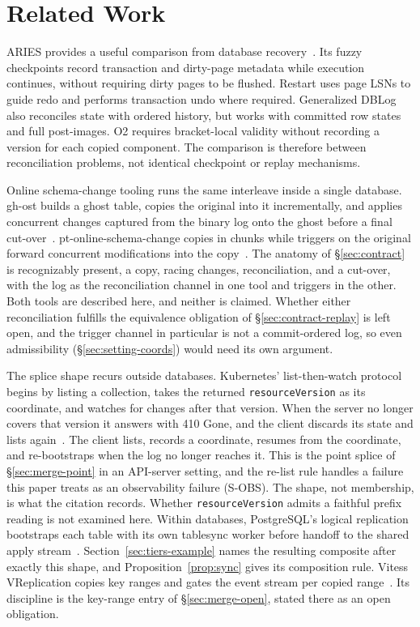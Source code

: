 \documentclass[sigconf,nonacm,10pt]{acmart}
\theoremstyle{plain}
\theoremstyle{definition}
\begin{document}
\section{Related Work}\label{sec:related}

ARIES provides a useful comparison from database recovery~\cite{mohan1992aries}. 
Its fuzzy 
checkpoints record transaction and dirty-page metadata while execution 
continues, without requiring dirty pages to be flushed. Restart uses 
page LSNs to guide redo and performs transaction undo where required. 
Generalized DBLog also reconciles state with ordered history, but works 
with committed row states and full post-images. O2 requires bracket-local 
validity without recording a version for each copied component. The 
comparison is therefore between reconciliation problems, not identical 
checkpoint or replay mechanisms.

Online schema-change tooling runs the same interleave inside a
single database. gh-ost builds a ghost table, copies the original
into it incrementally, and applies concurrent changes captured
from the binary log onto the ghost before a final
cut-over~\cite{ghost_docs}. pt-online-schema-change copies in
chunks while triggers on the original forward concurrent
modifications into the copy~\cite{ptosc_docs}. The anatomy of \S\ref{sec:contract} is recognizably present, a copy, racing changes, reconciliation, and a cut-over, with the log as the reconciliation channel in one tool and triggers in the other. Both
tools are described here, and neither is claimed. Whether either
reconciliation fulfills the equivalence obligation of
\S\ref{sec:contract-replay} is left open, and the trigger channel
in particular is not a commit-ordered log, so even admissibility
(\S\ref{sec:setting-coords}) would need its own argument.

The splice shape recurs outside databases. Kubernetes' list-then-watch
protocol begins by listing a collection, takes the returned
\texttt{resourceVersion} as its coordinate, and watches for changes
after that version. When the server no longer covers that version it
answers with 410 Gone, and the client discards its state and lists
again~\cite{k8s_api_concepts}. The client lists, records a coordinate, resumes from the coordinate, and re-bootstraps when the log no longer reaches it. This is the point splice of \S\ref{sec:merge-point} in an API-server setting, and the re-list rule handles a failure this paper treats as an observability failure (S-OBS). The shape, not
membership, is what the citation records. Whether
\texttt{resourceVersion} admits a faithful prefix reading is not
examined here. Within databases, PostgreSQL's logical replication
bootstraps each table with its own tablesync worker before
handoff to the shared apply
stream~\cite{postgres_logical_replication}.
Section~\ref{sec:tiers-example} names the resulting composite after
exactly this shape, and Proposition~\ref{prop:sync} gives its
composition rule. Vitess VReplication copies key ranges and gates the
event stream per copied range~\cite{vitess_vreplication}. Its
discipline is the key-range entry of \S\ref{sec:merge-open},
stated there as an open obligation.
\end{document}
